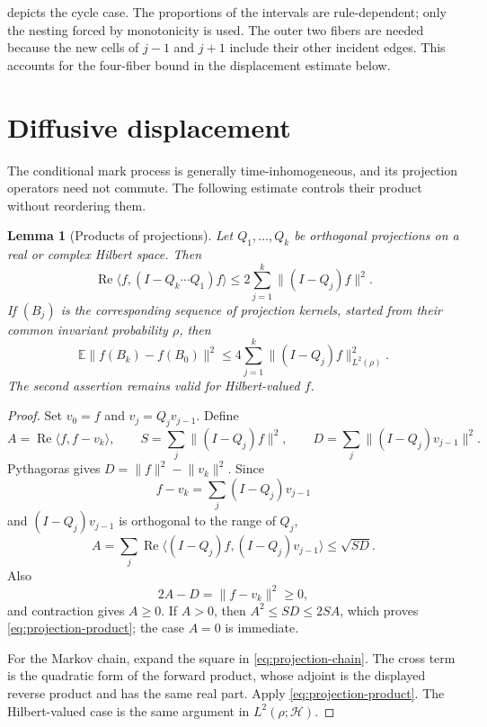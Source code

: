 \documentclass[11pt]{article}
\newtheorem{lemma}[lemma]{Lemma}
\theoremstyle{remark}
\newcommand{\E}{\mathbb{E}}
\newcommand{\ip}[2]{\langle #1,#2\rangle}
\newcommand{\norm}[1]{\lVert #1\rVert}
\begin{document}
 depicts the cycle case. The proportions of the intervals are rule-dependent; only the nesting forced by monotonicity is used. The outer two fibers are needed because the new cells of $j-1$ and $j+1$ include their other incident edges. This accounts for the four-fiber bound in the displacement estimate below.

\section{Diffusive displacement}\label{sec:diffusion}

The conditional mark process is generally time-inhomogeneous, and its projection operators need not commute. The following estimate controls their product without reordering them.

\begin{lemma}[Products of projections]\label{lem:projections}
Let $Q_1,\ldots,Q_k$ be orthogonal projections on a real or complex Hilbert space. Then
\[
 \operatorname{Re}\ip{f}{(I-Q_k\cdots Q_1)f}
 \le 2\sum_{j=1}^k\norm{(I-Q_j)f}^2.
 \tag{4.1}\label{eq:projection-product}
\]
If $(B_j)$ is the corresponding sequence of projection kernels, started from their common invariant probability $\rho$, then
\[
 \E\norm{f(B_k)-f(B_0)}^2
 \le4\sum_{j=1}^k\norm{(I-Q_j)f}_{L^2(\rho)}^2.
 \tag{4.2}\label{eq:projection-chain}
\]
The second assertion remains valid for Hilbert-valued $f$.
\end{lemma}

\begin{proof}
Set $v_0=f$ and $v_j=Q_jv_{j-1}$. Define
\[
 A=\operatorname{Re}\ip{f}{f-v_k},\qquad
 S=\sum_j\norm{(I-Q_j)f}^2,
 \qquad
 D=\sum_j\norm{(I-Q_j)v_{j-1}}^2.
\]
Pythagoras gives $D=\norm f^2-\norm{v_k}^2$. Since
\[
 f-v_k=\sum_j(I-Q_j)v_{j-1}
\]
and $(I-Q_j)v_{j-1}$ is orthogonal to the range of $Q_j$,
\[
 A
 =\sum_j\operatorname{Re}\ip{(I-Q_j)f}{(I-Q_j)v_{j-1}}
 \le\sqrt{SD}.
\]
Also
\[
 2A-D=\norm{f-v_k}^2\ge0,
\]
and contraction gives $A\ge0$. If $A>0$, then $A^2\le SD\le2SA$, which proves \eqref{eq:projection-product}; the case $A=0$ is immediate.

For the Markov chain, expand the square in \eqref{eq:projection-chain}. The cross term is the quadratic form of the forward product, whose adjoint is the displayed reverse product and has the same real part. Apply \eqref{eq:projection-product}. The Hilbert-valued case is the same argument in $L^2(\rho;\mathcal H)$.
\end{proof}
\end{document}

